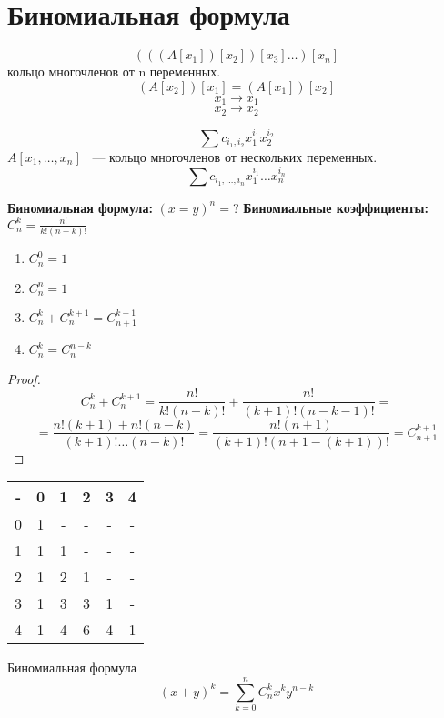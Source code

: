 ﻿\section{Биномиальная формула}
\begin{Def}
$$(((A[x_1])[x_2])[x_3] \ldots )[x_n]$$
кольцо многочленов от n переменных.
$$(A[x_2])[x_1] = (A[x_1])[x_2]$$
$$x_1 \to x_1$$
$$x_2 \to x_2$$

$$\sum c_{i_1, i_2}x_{1}^{i_1}x_2^{i_2}$$
$A[x_1, \ldots, x_n]$ ~--- кольцо многочленов от нескольких переменных.
$$\sum c_{i_1, \ldots, i_n}x_1^{i_1}\ldots x_n^{i_n} $$
\end{Def}

{\bf Биномиальная формула:} $(x = y)^n = ?$
{\bf Биномиальные коэффициенты:} $C_n^k = \frac{n!}{k!(n - k)!}$

\begin{lemma} 
\begin{enumerate}
\item $C_n^0 = 1$
\item $C_n^n = 1$
\item $C_n^k + C_n^{k + 1} = C_{n + 1}^{k + 1}$
\item $C_n^{k} = C_{n}^{n - k}$
\end{enumerate}
\end{lemma}
\begin{proof}
$$C_n^k + C_n^{k + 1} = \frac{n!}{k!(n - k)!} + \frac{n!}{(k + 1)!(n - k - 1)!} = $$
$$= \frac{n!(k + 1) + n!(n - k)}{(k + 1)! \ldots (n - k)!} = \frac{n!(n + 1)}{(k + 1)!(n + 1 - (k + 1))!} = C_{n + 1}^{k + 1}$$
\end{proof}

\begin{Def}
\begin{tabular}{c|ccccc}
-&0&1&2&3&4\\
\hline
0&1&-&-&-&-\\
1&1&1&-&-&-\\
2&1&2&1&-&-\\
3&1&3&3&1&-\\
4&1&4&6&4&1\\
\end{tabular}
\end{Def}

\begin{theorem}{Биномиальная формула}
$$(x + y)^k = \sum_{k = 0}^nC_n^kx^ky^{n - k}$$
\end{theorem}

